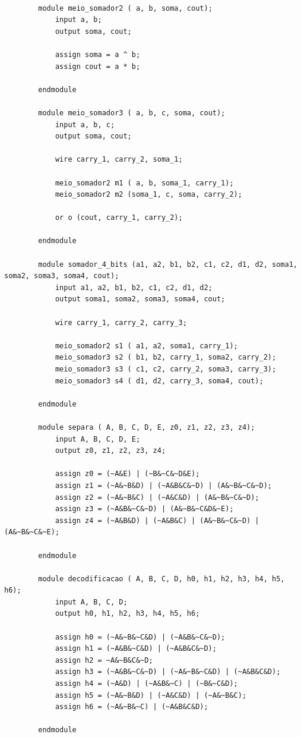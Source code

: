 		\begin{lstlisting}[frame=L, caption={Módulo do somador completo e suas dependências.},label=projeto]  % Start your code-block

		module meio_somador2 ( a, b, soma, cout);
    		input a, b;
    		output soma, cout;

	 		assign soma = a ^ b;
    		assign cout = a * b;

		endmodule

		module meio_somador3 ( a, b, c, soma, cout);
		    input a, b, c;
		    output soma, cout;

			wire carry_1, carry_2, soma_1;

		    meio_somador2 m1 ( a, b, soma_1, carry_1);
		    meio_somador2 m2 (soma_1, c, soma, carry_2);

			or o (cout, carry_1, carry_2);

		endmodule

		module somador_4_bits (a1, a2, b1, b2, c1, c2, d1, d2, soma1, soma2, soma3, soma4, cout);
			input a1, a2, b1, b2, c1, c2, d1, d2;
			output soma1, soma2, soma3, soma4, cout;

			wire carry_1, carry_2, carry_3;

			meio_somador2 s1 ( a1, a2, soma1, carry_1);
			meio_somador3 s2 ( b1, b2, carry_1, soma2, carry_2);
			meio_somador3 s3 ( c1, c2, carry_2, soma3, carry_3);
			meio_somador3 s4 ( d1, d2, carry_3, soma4, cout);

		endmodule

		module separa ( A, B, C, D, E, z0, z1, z2, z3, z4);
			input A, B, C, D, E;
			output z0, z1, z2, z3, z4;

			assign z0 = (~A&E) | (~B&~C&~D&E);
			assign z1 = (~A&~B&D) | (~A&B&C&~D) | (A&~B&~C&~D);
			assign z2 = (~A&~B&C) | (~A&C&D) | (A&~B&~C&~D);
			assign z3 = (~A&B&~C&~D) | (A&~B&~C&D&~E);
			assign z4 = (~A&B&D) | (~A&B&C) | (A&~B&~C&~D) | (A&~B&~C&~E);

		endmodule

		module decodificacao ( A, B, C, D, h0, h1, h2, h3, h4, h5, h6);
			input A, B, C, D;
			output h0, h1, h2, h3, h4, h5, h6;

			assign h0 = (~A&~B&~C&D) | (~A&B&~C&~D);
			assign h1 = (~A&B&~C&D) | (~A&B&C&~D);
			assign h2 = ~A&~B&C&~D;
			assign h3 = (~A&B&~C&~D) | (~A&~B&~C&D) | (~A&B&C&D);
			assign h4 = (~A&D) | (~A&B&~C) | (~B&~C&D);
			assign h5 = (~A&~B&D) | (~A&C&D) | (~A&~B&C);
			assign h6 = (~A&~B&~C) | (~A&B&C&D);

		endmodule


\end{lstlisting}
